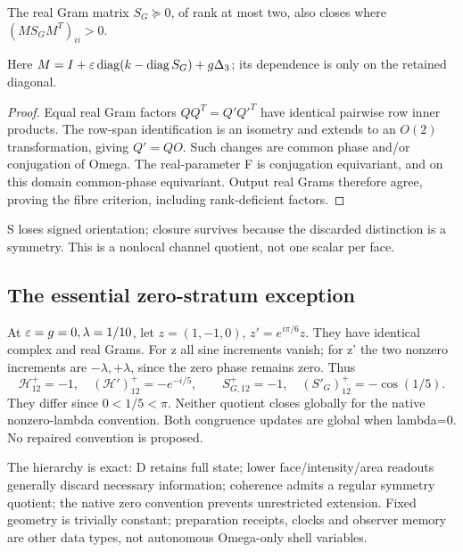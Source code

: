 \begin{theorem}\label{thm:Sclosure}
The real Gram matrix \(S_G\succeq0\), of rank at most two, also closes where \((MS_GM^T)_{ii}>0\).
\end{theorem}
Here \(M=I+\varepsilon\operatorname{diag}(k-\operatorname{diag} S_G)+g\Delta_3\); its dependence is only on the retained diagonal.
\begin{proof}
Equal real Gram factors \(QQ^T=Q'Q'^T\) have identical pairwise row inner products. The row-span identification is an isometry and extends to an \(O(2)\) transformation, giving \(Q'=QO\). Such changes are common phase and/or conjugation of Omega. The real-parameter F is conjugation equivariant, and on this domain common-phase equivariant. Output real Grams therefore agree, proving the fibre criterion, including rank-deficient factors.
\end{proof}
S loses signed orientation; closure survives because the discarded distinction is a symmetry. This is a nonlocal channel quotient, not one scalar per face.

\subsection{The essential zero-stratum exception}
At \(\varepsilon=g=0,\lambda=1/10\), let \(z=(1,-1,0)\), \(z'=e^{i\pi/6}z\). They have identical complex and real Grams. For z all sine increments vanish; for z' the two nonzero increments are \(-\lambda,+\lambda\), since the zero phase remains zero. Thus
\begin{equation}
\mathcal H^+_{12}=-1,\quad(\mathcal H')^+_{12}=-e^{-i/5},\qquad
S^+_{G,12}=-1,\quad(S'_G)^+_{12}=-\cos(1/5).\label{eq:zerocounter}
\end{equation}
They differ since \(0<1/5<\pi\). Neither quotient closes globally for the native nonzero-lambda convention. Both congruence updates are global when lambda=0. No repaired convention is proposed.

The hierarchy is exact: D retains full state; lower face/intensity/area readouts generally discard necessary information; coherence admits a regular symmetry quotient; the native zero convention prevents unrestricted extension. Fixed geometry is trivially constant; preparation receipts, clocks and observer memory are other data types, not autonomous Omega-only shell variables. 
